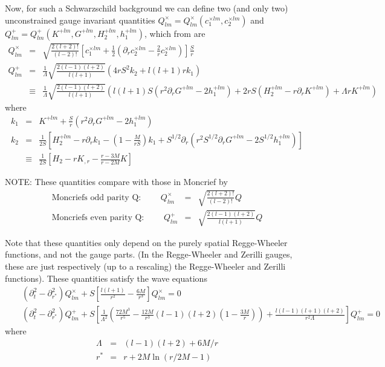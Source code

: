 Now, for such a Schwarzschild background we can define two (and only two)
unconstrained gauge invariant quantities 
  $Q^{\times}_{lm}=Q^{\times}_{lm}(c_1^{\times lm},c_2^{\times lm})$ 
and
  $Q^{+}_{lm}=Q^{+}_{lm}(K^{+ lm},G^{+ lm},H_2^{+lm},h_1^{+lm})$, 
which from
\cite{abrahams96a} are
\begin{eqnarray}
Q^{\times}_{lm} 
  & = & \sqrt{\frac{2(l+2)!}{(l-2)!}}\left[c_1^{\times lm}
        + \frac{1}{2}\left(\partial_r c_2^{\times lm} - \frac{2}{r}
        c_2^{\times lm}\right)\right] \frac{S}{r}
\\
Q^{+}_{lm}
  & = & \frac{1}{\Lambda}\sqrt{\frac{2(l-1)(l+2)}{l(l+1)}}
        (4rS^2 k_2+l(l+1)r k_1) 
\\
  & \equiv &
        \frac{1}{\Lambda}\sqrt{\frac{2(l-1)(l+2)}{l(l+1)}}
        \left(l(l+1)S(r^2\partial_r G^{+lm}-2h_1^{+lm})+
        2rS(H_2^{+lm}-r\partial_r K^{+lm})+\Lambda r K^{+lm}\right)
\end{eqnarray}
where
\begin{eqnarray}
k_1 & = & K^{+lm} + \frac{S}{r}(r^2\partial_r G^{+lm} - 2h^{+lm}_1) \\
k_2 & = & \frac{1}{2S}
          \left[H^{+lm}_2-r\partial_r k_1-\left(1-\frac{M}{rS}\right) 
            k_1 + S^{1/2}\partial_r
          (r^2 S^{1/2} \partial_r G^{+lm}-2S^{1/2}h_1^{+lm})\right]
\\
&\equiv& \frac{1}{2S}\left[H_2-rK_{,r}-\frac{r-3M}{r-2M}K\right]
\end{eqnarray}

\noindent
NOTE: These quantities compare with those in Moncrief \cite{moncrief74} by
\begin{eqnarray*}
\mbox{Moncriefs odd parity Q: }\qquad Q^\times_{lm} &=&
 \sqrt{\frac{2(l+2)!}{(l-2)!}}Q
 \\
\mbox{Moncriefs even parity Q: } \qquad Q^+_{lm} &=&
 \sqrt{\frac{2(l-1)(l+2)}{l(l+1)}}Q
\end{eqnarray*}

Note that these quantities only depend on the purely spatial 
Regge-Wheeler functions, and not the gauge parts. (In the Regge-Wheeler 
and Zerilli gauges, these are just respectively (up to a rescaling)
 the Regge-Wheeler 
and Zerilli functions).
These quantities satisfy the wave equations
\begin{eqnarray*}
  &&(\partial^2_t-\partial^2_{r^*})Q^\times_{lm}+S\left[\frac{l(l+1)}{r^2}-\frac{6M}{r^3}
  \right]Q^{\times}_{lm}  =  0 
  \\
  &&(\partial^2_t-\partial^2_{r^*})Q^+_{lm}+S\left[
    \frac{1}{\Lambda^2}\left(\frac{72M^3}{r^5}-\frac{12M}{r^3}(l-1)(l+2)\left(1-\frac{3M}{r}\right)
    \right)+\frac{l(l-1)(l+1)(l+2)}{r^2\Lambda}\right]Q^+_{lm}=0
\end{eqnarray*}
where
\begin{eqnarray*}
  \Lambda &=& (l-1)(l+2)+6M/r \\
  r^*     &=& r+2M\ln(r/2M-1)
\end{eqnarray*}
 



